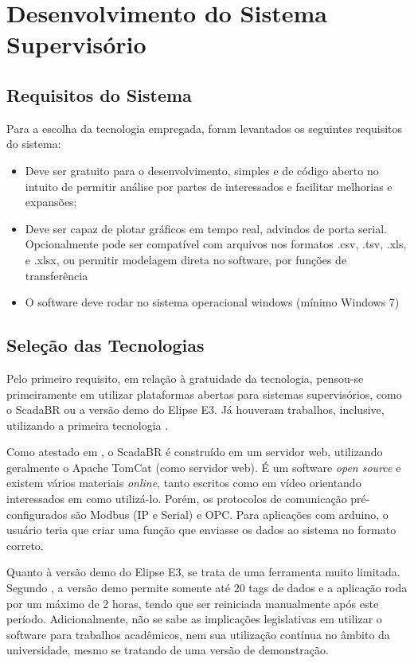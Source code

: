 \chapter{Desenvolvimento do Sistema Supervisório}

\section{Requisitos do Sistema}

Para a escolha da tecnologia empregada, foram levantados os seguintes requisitos do sistema:
\begin{itemize}
	\item Deve ser gratuito para o desenvolvimento, simples e de código aberto no intuito de permitir análise por partes de interessados e facilitar melhorias e expansões;
	\item Deve ser capaz de plotar gráficos em tempo real, advindos de porta serial. Opcionalmente pode ser compatível com arquivos nos formatos .csv, .tsv, .xls, e .xlsx, ou permitir modelagem direta no software, por funções de transferência
	\item O software deve rodar no sistema operacional windows (mínimo Windows 7)
\end{itemize}

\section{Seleção das Tecnologias}

Pelo primeiro requisito, em relação à gratuidade da tecnologia, pensou-se primeiramente em utilizar plataformas abertas para sistemas supervisórios, como o ScadaBR ou a versão demo do Elipse E3. Já houveram trabalhos, inclusive, utilizando a primeira tecnologia \cite{Moraes2016}.

Como atestado em , o ScadaBR é construído em um servidor web, utilizando geralmente o Apache TomCat (como servidor web). É um software \emph{open source} e existem vários materiais \emph{online}, tanto escritos como em vídeo orientando interessados em como utilizá-lo. Porém, os protocolos de comunicação pré-configurados são Modbus (IP e Serial) e OPC. Para aplicações com arduino, o usuário teria que criar uma função que enviasse os dados ao sistema no formato correto.

Quanto à versão demo do Elipse E3, se trata de uma ferramenta muito limitada. Segundo , a versão demo permite somente até 20 tags de dados e a aplicação roda por um máximo de 2 horas, tendo que ser reiniciada manualmente após este período. Adicionalmente, não se sabe as implicações legislativas em utilizar o software para trabalhos acadêmicos, nem sua utilização contínua no âmbito da universidade, mesmo se tratando de uma versão de demonstração.

